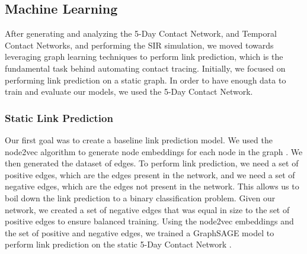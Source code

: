 \documentclass[times, 10pt,twocolumn]{article}
\begin{document}
\subsection{Machine Learning}



After generating and analyzing the 5-Day Contact Network, and Temporal Contact Networks, and performing the SIR simulation, we moved towards leveraging graph learning techniques to perform link prediction, which is the fundamental task behind automating contact tracing. Initially, we focused on performing link prediction on a static graph. In order to have enough data to train and evaluate our models, we used the 5-Day Contact Network. 

\subsubsection{Static Link Prediction}
Our first goal was to create a baseline link prediction model. We used the node2vec algorithm to generate node embeddings for each node in the graph \cite{grover2016node2vec}. We then generated the dataset of edges. To perform link prediction, we need a set of positive edges, which are the edges present in the network, and we need a set of negative edges, which are the edges not present in the network. This allows us to boil down the link prediction to a binary classification problem. Given our network, we created a set of negative edges that was equal in size to the set of positive edges to ensure balanced training. Using the node2vec embeddings and the set of positive and negative edges, we trained a GraphSAGE model to perform link prediction on the static 5-Day Contact Network \cite{hamilton2018inductive}.
\end{document}
